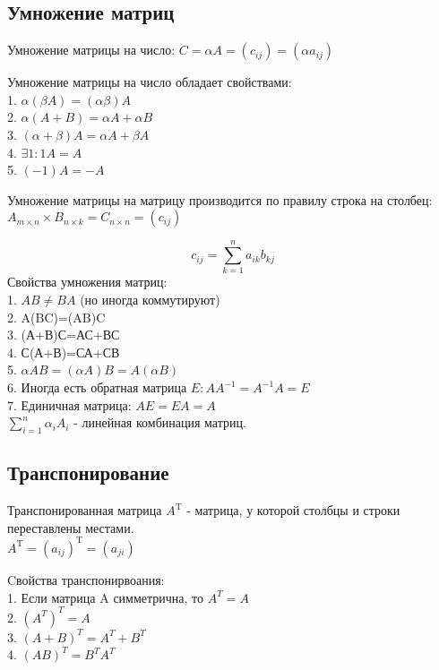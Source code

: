 \subsection{Умножение матриц}
\begin{defin}
Умножение матрицы на число: $C=\alpha A=(c_{ij})=(\alpha a_{ij})$
\end{defin}
Умножение матрицы на число обладает свойствами:\\
1. $\alpha(\beta A)=(\alpha \beta)A$ \\
2. $\alpha(A+B)=\alpha A+\alpha B$\\
3. $(\alpha+\beta)A=\alpha A+\beta A$\\
4. $\exists 1: 1A=A$\\
5. $(-1)A=-A$

\begin{defin}
Умножение матрицы на матрицу производится по правилу строка на столбец:
$A_{m\times n}\times B_{n\times k}=C_{n\times n}=(c_{ij})$

\end{defin}
\begin{equation*}
\boxed{c_{ij}=\sum\limits^n_{k=1} a_{ik} b_{kj}}    
\end{equation*}
Свойства умножения матриц:\\
1. $AB\ne BA$ (но иногда коммутируют)\\
2. A(BC)=(AB)C\\
3. (А+В)С=АС+ВС\\
4. С(А+В)=СА+СВ\\
5. $\alpha AB=(\alpha A)B=A(\alpha B)$\\
6. Иногда есть обратная матрица $E: AA^{-1}=A^{-1}A=E$ \\
7. Единичная матрица: $AE=EA=A$\\

$\sum\limits^n_{i=1}\alpha_i A_i $ - линейная комбинация матриц.


\subsection{Транспонирование}
\begin{defin}
Транспонированная матрица $A^\mathrm{T}$ - матрица, у которой столбцы и 
строки переставлены местами.\\
$A^\mathrm{T}=(a_{ij})^\mathrm{T}=(a_{ji})$
\end{defin}
Cвойства транспонирвоания:\\
1. Если матрица A симметрична, то $A^T=A$\\
2. $(A^T)^T=A$\\
3. $(A+B)^T=A^T+B^T$\\
4. $(AB)^T=B^TA^T$\\


